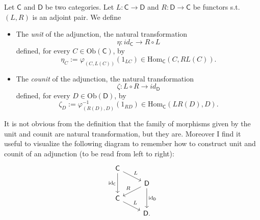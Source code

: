 \begin{defn}
	Let $\mathsf{C}$ and $\mathsf{D}$ be two categories.
	Let $L: \mathsf{C} \to \mathsf{D}$ and $R: \mathsf{D} \to \mathsf{C}$ be functors
	s.t. $\left(L, R\right)$ is an adjoint pair.
	We define
	\begin{itemize}
		\item The {\em unit} of the adjunction, the natural transformation
			\begin{equation}
			\eta: id_{\mathsf{C}} \to R \circ L
			\end{equation} 
			defined, for every $C \in \mathrm{Ob} \left(\mathsf{C}\right)$, by
			\begin{equation}
				\eta_C := \varphi_{(C, L(C))} \left( 1_{LC} \right) \in \mathrm{Hom}_{\mathsf{C}} \left( C, RL(C) \right)
			.\end{equation} 
		\item The {\em counit} of the adjunction, the natural transformation
			\begin{equation}
			\zeta: L \circ R \to id_{\mathsf{D}}
			\end{equation} 
			defined, for every $D \in \mathrm{Ob} \left(\mathsf{D}\right)$, by
			\begin{equation}
				\zeta_D := \varphi_{(R(D), D)}^{-1} \left( 1_{RD} \right) \in \mathrm{Hom}_{\mathsf{C}} \left( LR(D), D \right)
			.\end{equation} 
	\end{itemize}
\end{defn}

\begin{rem}[]
	It is not obvious from the definition that the family of morphisms given by the unit and counit
	are natural transformation, but they are.
	Moreover I find it useful to visualize the following diagram to remember how to construct
	unit and counit of an adjunction (to be read from left to right):
	\begin{equation}
	\begin{tikzcd}[row sep=0.7em]
		\mathsf{C} \arrow[rd, "L", rightarrow] 
		\arrow[dd, "\mathrm{id}_{ \mathsf{C} }"', rightarrow] 
		& \\
		& \mathsf{D} 
		\arrow[dd, "\mathrm{id}_{ \mathsf{D} }", rightarrow] 
		\arrow[ld, "R"', rightarrow] \\
		\mathsf{C} \arrow[rd, "L", rightarrow] 
		& \\
		& \mathsf{D}
	.\end{tikzcd}
	\end{equation}
\end{rem}

